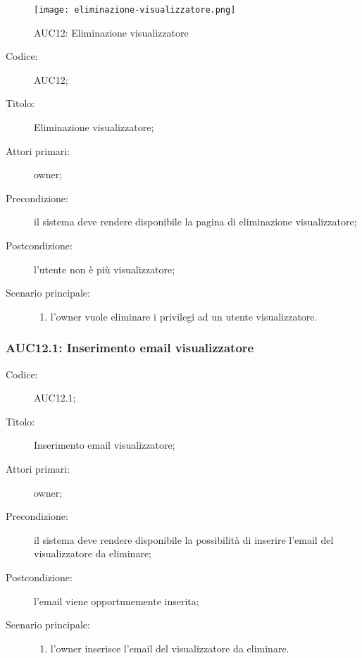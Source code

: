 \documentclass[../../../analisi-dei-requisiti.tex]{subfiles}
\begin{document}
\begin{figure}[H]
  \centering
  \texttt{[image: eliminazione-visualizzatore.png]}
  \caption{AUC12: Eliminazione visualizzatore}%
  \label{fig:AUC12}
\end{figure}

\begin{description}
  \item[Codice:] AUC12;
  \item[Titolo:] Eliminazione visualizzatore;
  \item[Attori primari:] owner;
  \item[Precondizione:] il sistema deve rendere disponibile la pagina di eliminazione visualizzatore;
  \item[Postcondizione:] l'utente non è più visualizzatore;
  \item[Scenario principale:]
        \begin{enumerate}
          \item l'owner vuole eliminare i privilegi ad un utente visualizzatore.
        \end{enumerate}
\end{description}

\subsubsection{AUC12.1: Inserimento email visualizzatore}%
\label{subs:AUC12.1}
\begin{description}
  \item[Codice:] AUC12.1;
  \item[Titolo:] Inserimento email visualizzatore;
  \item[Attori primari:] owner;
  \item[Precondizione:] il sistema deve rendere disponibile la possibilità di inserire l'email del visualizzatore da eliminare;
  \item[Postcondizione:] l'email viene opportunemente inserita;
  \item[Scenario principale:]
        \begin{enumerate}
          \item l'owner inserisce l'email del visualizzatore da eliminare.
        \end{enumerate}
\end{description}
\end{document}
